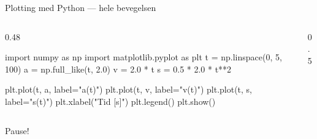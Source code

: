 \documentclass[aspectratio=169, 12pt]{beamer}
\begin{document}
\begin{frame}[fragile]{Plotting med Python --- hele bevegelsen}

  \begin{columns}[t]
    \begin{column}{0.48\textwidth}
\begin{pycode}
import numpy as np
import matplotlib.pyplot as plt
t = np.linspace(0, 5, 100)
a = np.full_like(t, 2.0)
v = 2.0 * t
s = 0.5 * 2.0 * t**2

plt.plot(t, a, label="a(t)")
plt.plot(t, v, label="v(t)")
plt.plot(t, s, label="s(t)")
plt.xlabel("Tid [s]")
plt.legend()
plt.show()
\end{pycode}
    \end{column}
    \begin{column}{0.5\textwidth}
      \begin{center}
      \end{center}
    \end{column}
  \end{columns}

\end{frame}

\begin{frame}{}
\begin{center}
\Huge{Pause!}
\end{center}
\end{frame}
\end{document}

